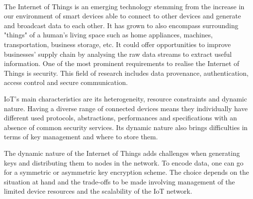 \documentclass[14]{article}
\begin{document}
\author{\textbf{Faculty of Sciences and Bio-Engineering Sciences}\\[2\baselineskip]\newline\textbf{Arthur Chomé}}

\date{ \LARGE Security within the Internet Of things: \break A Literature Review}
\title{\vspace{-2cm}}%

\maketitle\mbox{}\\

The Internet of Things is an emerging technology\cite{atzori2010internet} stemming from the increase in our environment of smart devices able to connect to other devices and generate and broadcast data to each other. It has grown to also encompass surrounding "things" of a human’s living space such as home appliances, machines, transportation, business storage, etc. It could offer opportunities to improve businesses' supply chain\cite{ben2019internet} by analysing the raw data streams to extract useful information. One of the most prominent requirements to realise the Internet of Things is security. This field of research includes data provenance, authentication, access control and secure communication. 
\newline

IoT's main characteristics\cite{oh2017security} are its heterogeneity, resource constraints and dynamic nature. Having a diverse range of connected devices means they individually have different used protocols\cite{sethi2017internet}, abstractions, performances and specifications with an absence of common security services. Its dynamic nature also brings difficulties in terms of key management and where to store them.

The dynamic nature of the Internet of Things adds challenges \cite{roman2011key} when generating keys and distributing them to nodes in the network. To encode data, one can go for a symmetric\cite{gomes2014internet} or asymmetric key encryption scheme. The choice depends on the situation at hand and the trade-offs to be made involving management of the limited device resources\cite{katagi2008lightweight} and the scalability of the IoT network\cite{gomes2014internet}.
\end{document}
